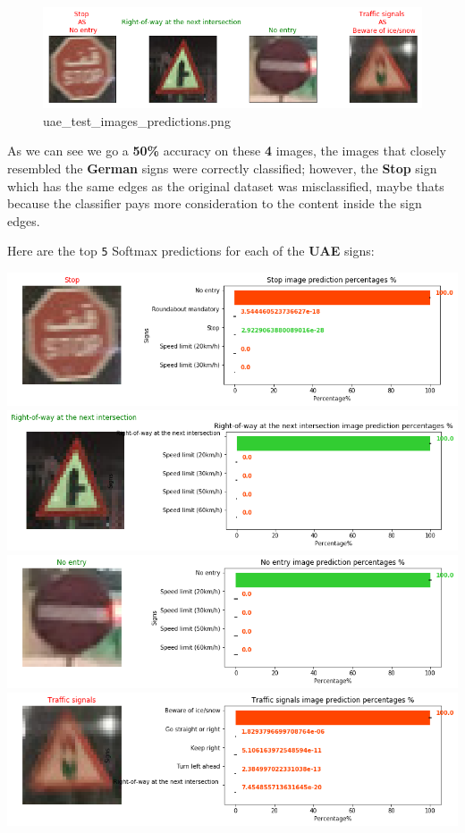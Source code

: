 \documentclass[11pt]{article}
\makeatletter
\def\maxwidth{\ifdim\Gin@nat@width>\linewidth\linewidth
    \else\Gin@nat@width\fi}
\let\Oldincludegraphics\includegraphics
\renewcommand{\includegraphics}[1]{\Oldincludegraphics[width=.8\maxwidth]{#1}}
\makeatother
\begin{document}
\begin{figure}
\centering
\includegraphics{./assets/uae_test_images_predictions.png}
\caption{uae\_test\_images\_predictions.png}
\end{figure}

As we can see we go a \textbf{50\%} accuracy on these \textbf{4} images,
the images that closely resembled the \textbf{German} signs were
correctly classified; however, the \textbf{Stop} sign which has the same
edges as the original dataset was misclassified, maybe thats because the
classifier pays more consideration to the content inside the sign edges.

Here are the top \texttt{5} Softmax predictions for each of the
\textbf{UAE} signs:

\includegraphics{./assets/uae_sm1.png}
\includegraphics{./assets/uae_sm2.png}
\includegraphics{./assets/uae_sm3.png}
\includegraphics{./assets/uae_sm4.png}
\end{document}
